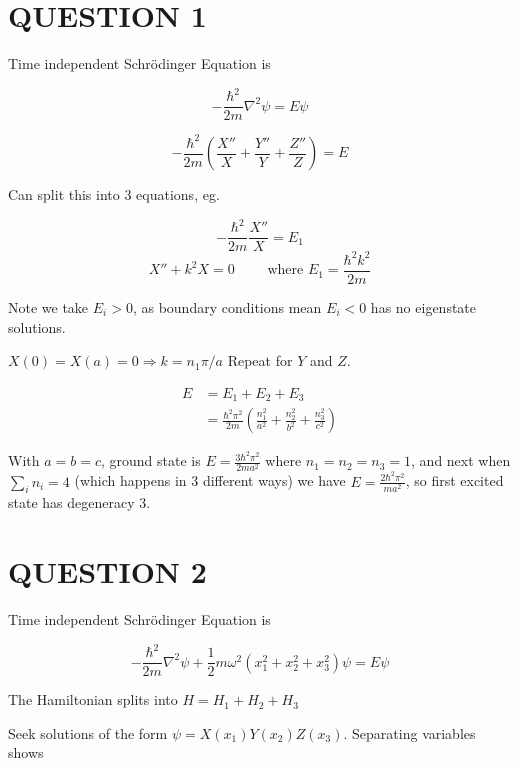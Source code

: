 \documentclass[a4paper]{article}
\begin{document}
	
\maketitle

\section{QUESTION 1}

Time independent Schr\"odinger Equation is 

\[ - \frac{\hbar^{2}}{2m} \nabla^{2} \psi = E \psi \]

\[  - \frac{\hbar^{2}}{2m} \left(  \frac{X''}{X} +  \frac{Y''}{Y} +  \frac{Z''}{Z} \right)  = E  \]

Can split this into 3 equations, eg.



\[ - \frac{\hbar^{2}}{2m}\frac{X''}{X} = E_{1} \]
\[ X'' + k^{2}X = 0  \qquad \text{ where } E_{1} = \frac{\hbar^{2}k^{2}}{2m}  \]

Note we take $ E_{i} > 0 $, as boundary conditions mean $ E_{i} < 0 $ has no eigenstate solutions.

$ X(0) = X(a) = 0 \Rightarrow k = n_{1} \pi / a  $
Repeat for $ Y $ and $ Z $. 

\begin{align*}
 E & = E_{1} + E_{2} + E_{3} \\
  & = \frac{\hbar^{2} \pi^{2}}{2m} \left(  \frac{n_{1}^{2}}{a^{2}} + \frac{n_{2}^{2}}{b^{2}} + \frac{n_{3}^{2}}{c^{2}}  \right)
\end{align*}
 
 With $ a = b = c $, ground state is $  E = \frac{3 \hbar^{2} \pi^{2}}{2ma^{2}} $ where $ n_{1} = n_{2} = n_{3} = 1 $, and next when $ \sum_{i} n_{i} = 4 $ (which happens in 3 different ways) we have $  E = \frac{2\hbar^{2} \pi^{2}}{ma^{2}} $, so first excited state has degeneracy 3. 

\section{QUESTION 2}

Time independent Schr\"odinger Equation is 


\[ - \frac{\hbar^{2}}{2m} \nabla^{2} \psi  + \frac{1}{2} m \omega^{2} (x_{1}^{2} + x_{2}^{2} + x_{3}^{2}) \psi  = E \psi \]

The Hamiltonian splits into $ H = H_{1} + H_{2} + H_{3} $

Seek solutions of the form $ \psi = X(x_{1})Y(x_{2})Z(x_{3}) $.
Separating variables shows
\end{document}
